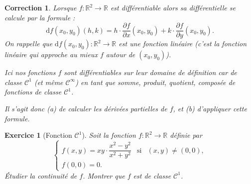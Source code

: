 \documentclass[11pt,a4paper]{article}
\newcommand{\Rr}{\mathbb{R}} \newcommand{\R}{\mathbb{R}}
\theoremstyle{exostyle}
\newtheorem{exo}{Exercice}
\newtheorem{cor}{Correction}
\newcommand{\exercice}[1]{} \newcommand{\finexercice}{}
\newcommand{\enonce}{\begin{exo}} \newcommand{\finenonce}{\end{exo}}
\newcommand{\correction}{\begin{cor}} \newcommand{\fincorrection}{\end{cor}}
\begin{document}
\correction
Lorsque $f : \Rr^2 \to \Rr$ est différentiable alors sa différentielle se calcule par la formule :
\[
\mathrm{d} f(x_0,y_0)(h,k) = 
h \cdot \frac{\partial f}{\partial x}(x_0,y_0) + 
k \cdot \frac{\partial f}{\partial y}(x_0,y_0).
\]
On rappelle que $\mathrm{d} f(x_0,y_0) : \Rr^2 \to \Rr$ est une fonction linéaire (c'est la fonction linéaire qui approche au mieux $f$ autour de $(x_0,y_0)$).

Ici nos fonctions $f$ sont différentiables sur leur domaine de définition car de classe $\mathcal{C}^1$ (et même $\mathcal{C}^\infty$) en tant que somme, produit, quotient, composée de fonctions de classe $\mathcal{C}^1$.

Il s'agit donc (a) de calculer les dérivées partielles de $f$, et (b)  d'appliquer cette formule.
\fincorrection

\finexercice


\exercice{1800, ridde, 1999/11/01}

\enonce[Fonction $^1$]
Soit la fonction $f \colon \R^{2} \longrightarrow \R$ définie par
\[
\left\{\begin{array}{lll}
	f(x, y)= xy \cdot \dfrac{x^{2}-y^{2}}
	{x^{2} + y^{2}}& \mathrm{ si } &(x, y) \neq (0,0),\\[2ex]
	f(0, 0)= 0.
\end{array}\right.
\]
\'Etudier la continuité de $f$. Montrer que $f$ est de classe $^{1}$.
\finenonce
\end{document}
